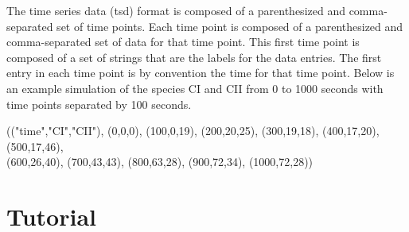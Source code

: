\documentclass[titlepage,11pt]{article}
\begin{document}
\noindent
The time series data (tsd) format is composed of a
parenthesized and comma-separated set of time points. Each time
point is composed of a parenthesized and comma-separated set of
data for that time point. This first time point is composed of a
set of strings that are the labels for the data entries. The
first entry in each time point is by convention the time for that
time point. Below is an example simulation of the species CI and
CII from 0 to 1000 seconds with time points separated by 100
seconds. 

(("time","CI","CII"), (0,0,0), (100,0,19), (200,20,25), (300,19,18),
(400,17,20), (500,17,46), \\
(600,26,40), (700,43,43), (800,63,28), (900,72,34), (1000,72,28))

\section{Tutorial}
\end{document}
